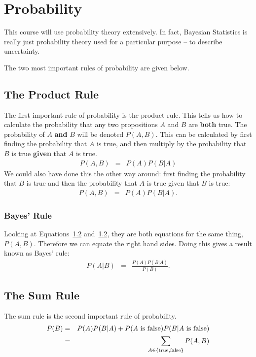 \chapter{Probability}
This course will use probability theory extensively. In fact, Bayesian
Statistics is really just probability theory used for a particular purpose --
to describe uncertainty.

The two most important rules of probability are given below.

\section{The Product Rule}
The first important rule of probability is the
product rule. This tells us how to calculate the probability that any two
propositions $A$ and $B$ are {\bf both} true. The probability of $A$ {\bf and}
$B$ will be denoted $P(A, B)$. This can be calculated by first finding the
probability that $A$ is true, and then multiply by the probability that $B$ is
true {\bf given} that $A$ is true.
\begin{eqnarray}
P(A, B) &=& P(A)P(B|A)
\end{eqnarray}
We could also have done this the other way around: first finding the
probability that $B$ is true and then the probability that $A$ is true given
that $B$ is true:
\begin{eqnarray}
P(A, B) &=& P(A)P(B|A).
\end{eqnarray}

\subsection{Bayes' Rule}
Looking at Equations~\ref{} and~\ref{}, they are both equations for the same
thing, $P(A,B)$. Therefore we can equate the right hand sides. Doing this gives
a result known as Bayes' rule:
\begin{eqnarray}
P(A|B) &=& \frac{P(A)P(B|A)}{P(B)}.
\end{eqnarray}

\section{The Sum Rule}
The sum rule is the second important rule of probability.
\begin{eqnarray}
P(B) &=& P(A)P(B|A) + P(A\textnormal{ is false})P(B|A\textnormal{ is false}) \\
&=& \sum_{A \in \{\rm true, false\}} P(A, B)
\end{eqnarray}


